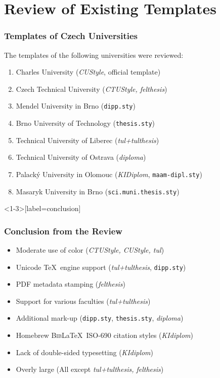 \documentclass[11pt,twoside]{article}
\def\pkg#1{{\sf#1}}
\let\pkg\emph
\let\oldframetitle\frametitle
\def\frametitle#1{\oldframetitle{#1}\noindent}
\begin{document}
\section{Review of Existing Templates}
\def\right#1{{\hfill\ifbeamerarticle\else
    \textcolor{white!33!black}{\scriptsize
  \fi(#1)\ifbeamerarticle\else}\fi}}
\begin{frame}[fragile]
  \frametitle{Templates of Czech Universities}
  The templates of the following universities were reviewed:
  \begin{enumerate}
    \item Charles University\right{\pkg{CUStyle}, official template}
    \item Czech Technical University\right{\pkg{CTUStyle, felthesis}}
    \item Mendel University in Brno\right{\texttt{dipp.sty}}
    \item Brno University of Technology\right{\texttt{thesis.sty}}
    \item Technical University of Liberec\right{\pkg{tul+tulthesis}}
    \item Technical University of Ostrava\right{\pkg{diploma}}
    \item Palacký University in Olomouc\right{\pkg{KIDiplom},
      \texttt{maam-dipl.sty}}
    \item Masaryk University in Brno\right{\texttt{sci.muni.thesis.sty}}
  \end{enumerate}
\end{frame}
\begin{frame}<1-3>[label=conclusion]
  \frametitle{Conclusion from the Review}
  \begin{itemize}
    \item<1,4,5> Moderate use of color \right{\pkg{CTUStyle, CUStyle,
      tul}}
    \item<1,4,6> Unicode \TeX\ engine support\right{\pkg{tul+tulthesis},
      \texttt{dipp.sty}}
    \item<1,4,7> PDF metadata stamping \right{\pkg{felthesis}}
    \item<1,4,8,9> Support for various
      faculties\right{\pkg{tul+tulthesis}}
    \item<2> Additional mark-up
      \right{\texttt{dipp.sty}, \texttt{thesis.sty}, \pkg{diploma}}
    \item<2> Homebrew \textsc{Bib}\LaTeX\ ISO-690 citation styles
      \right{\pkg{KIdiplom}}
  \end{itemize}\begin{itemize}
    \item<3,4> Lack of double-sided typesetting\right{\pkg{KIdiplom}}
    \item<3,4> Overly large \texttt{\string\textwidth}\right{All except
      \pkg{tul+tulthesis, felthesis}}
  \end{itemize}
\end{frame}
\end{document}

